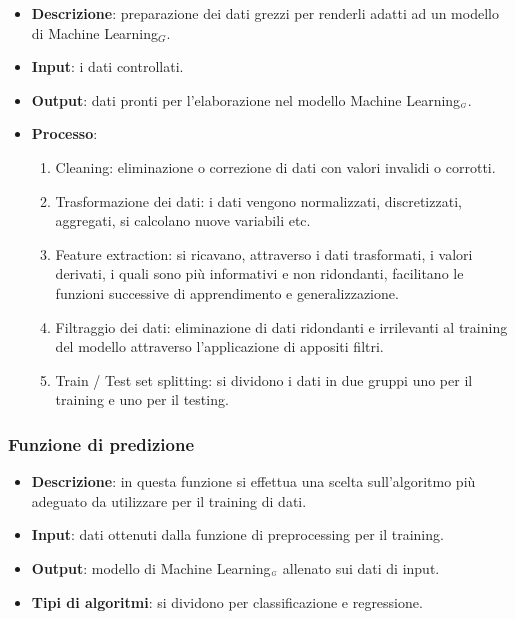 \begin{itemize}
	\item \textbf{Descrizione}: preparazione dei dati grezzi per renderli adatti ad un modello di Machine Learning$_G$.
	\item \textbf{Input}: i dati controllati.
	\item \textbf{Output}: dati pronti per l'elaborazione nel modello Machine Learning$_{\scaleto{G}{3pt}}$.
	\item \textbf{Processo}: \begin{enumerate}[leftmargin = 2cm]
		\item Cleaning: eliminazione o correzione di dati con valori invalidi o corrotti.
		\item Trasformazione dei dati: i dati vengono normalizzati, discretizzati, aggregati, si calcolano nuove variabili etc.
		\item Feature extraction: si ricavano, attraverso i dati trasformati, i valori derivati, i quali sono più informativi e non ridondanti, facilitano le funzioni successive di apprendimento e generalizzazione.
		\item Filtraggio dei dati: eliminazione di dati ridondanti e irrilevanti al training del modello attraverso l'applicazione di appositi filtri.
		\item Train / Test set splitting: si dividono i dati in due gruppi uno per il training e uno per il testing.
	\end{enumerate}

\end{itemize}

\subsubsection{Funzione di predizione}\label{}

\begin{itemize}
	\item \textbf{Descrizione}: in questa funzione si effettua una scelta sull'algoritmo più adeguato da utilizzare per il training di dati.
	\item \textbf{Input}: dati ottenuti dalla funzione di preprocessing per il training.
	\item \textbf{Output}: modello di Machine Learning$_{\scaleto{G}{3pt}}$ allenato sui dati di input.
	\item \textbf{Tipi di algoritmi}: si dividono per classificazione e regressione.%
\end{itemize}

